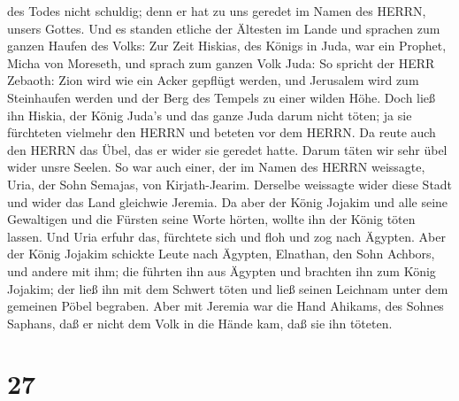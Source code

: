 des Todes nicht schuldig; denn er hat zu uns geredet im Namen des HERRN,
unsers Gottes.  Und es standen etliche der Ältesten im
Lande und sprachen zum ganzen Haufen des Volks:  Zur Zeit
Hiskias, des Königs in Juda, war ein Prophet, Micha von Moreseth, und
sprach zum ganzen Volk Juda: So spricht der HERR Zebaoth: Zion wird wie
ein Acker gepflügt werden, und Jerusalem wird zum Steinhaufen werden und
der Berg des Tempels zu einer wilden Höhe.  Doch ließ ihn
Hiskia, der König Juda's und das ganze Juda darum nicht töten; ja sie
fürchteten vielmehr den HERRN und beteten vor dem HERRN. Da reute auch
den HERRN das Übel, das er wider sie geredet hatte. Darum täten wir sehr
übel wider unsre Seelen.  So war auch einer, der im Namen
des HERRN weissagte, Uria, der Sohn Semajas, von Kirjath-Jearim.
Derselbe weissagte wider diese Stadt und wider das Land gleichwie
Jeremia.  Da aber der König Jojakim und alle seine
Gewaltigen und die Fürsten seine Worte hörten, wollte ihn der König
töten lassen. Und Uria erfuhr das, fürchtete sich und floh und zog nach
Ägypten.  Aber der König Jojakim schickte Leute nach
Ägypten, Elnathan, den Sohn Achbors, und andere mit ihm; 
die führten ihn aus Ägypten und brachten ihn zum König Jojakim; der ließ
ihn mit dem Schwert töten und ließ seinen Leichnam unter dem gemeinen
Pöbel begraben.  Aber mit Jeremia war die Hand Ahikams, des
Sohnes Saphans, daß er nicht dem Volk in die Hände kam, daß sie ihn
töteten.

\hypertarget{section-26}{%
\section{27}\label{section-26}}

